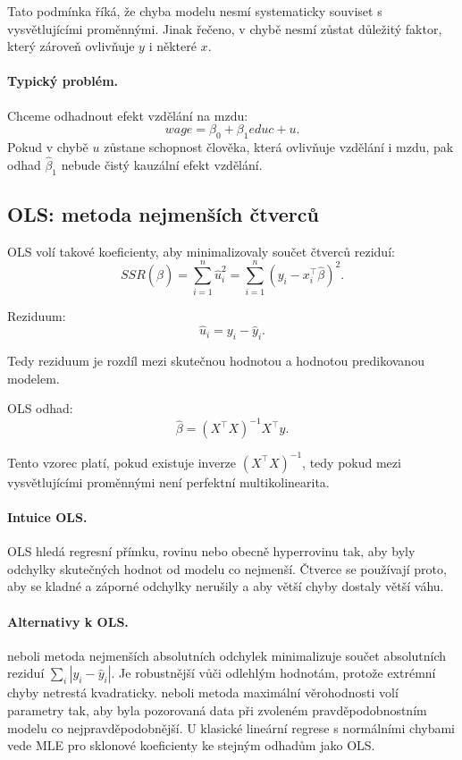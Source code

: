Tato podmínka říká, že chyba modelu nesmí systematicky souviset s vysvětlujícími proměnnými. Jinak řečeno,
v chybě nesmí zůstat důležitý faktor, který zároveň ovlivňuje $y$ i některé $x$.

\paragraph{Typický problém.}
Chceme odhadnout efekt vzdělání na mzdu:
\[
wage = \beta_0 + \beta_1 educ + u.
\]
Pokud v chybě $u$ zůstane schopnost člověka, která ovlivňuje vzdělání i mzdu, pak odhad $\hat\beta_1$
nebude čistý kauzální efekt vzdělání.

\subsection{OLS: metoda nejmenších čtverců}

OLS volí takové koeficienty, aby minimalizovaly součet čtverců reziduí:
\[
SSR(\hat\beta)=\sum_{i=1}^n \hat u_i^2
=
\sum_{i=1}^n (y_i-x_i^\top\hat\beta)^2.
\]

Reziduum:
\[
\hat u_i = y_i-\hat y_i.
\]

Tedy reziduum je rozdíl mezi skutečnou hodnotou a hodnotou predikovanou modelem.

OLS odhad:
\[
\hat\beta = (X^\top X)^{-1}X^\top y.
\]

Tento vzorec platí, pokud existuje inverze $(X^\top X)^{-1}$, tedy pokud mezi vysvětlujícími proměnnými
není perfektní multikolinearita.

\paragraph{Intuice OLS.}
OLS hledá regresní přímku, rovinu nebo obecně hyperrovinu tak, aby byly odchylky skutečných hodnot od
modelu co nejmenší. Čtverce se používají proto, aby se kladné a záporné odchylky nerušily a aby větší chyby
dostaly větší váhu.

\paragraph{Alternativy k OLS.}
 neboli metoda nejmenších absolutních odchylek minimalizuje součet absolutních reziduí
\(\sum_i |y_i-\hat y_i|\). Je robustnější vůči odlehlým hodnotám, protože extrémní chyby netrestá
kvadraticky.  neboli metoda maximální věrohodnosti volí parametry tak, aby byla pozorovaná
data při zvoleném pravděpodobnostním modelu co nejpravděpodobnější. U klasické lineární regrese s
normálními chybami vede MLE pro sklonové koeficienty ke stejným odhadům jako OLS.

